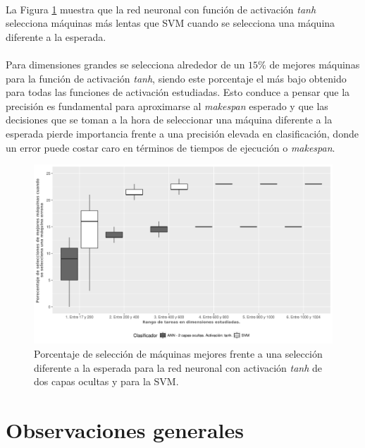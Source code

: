 \paragraph{} La Figura \ref{fig:tanh_mejores} muestra que la red neuronal con función de activación \textit{tanh} selecciona máquinas más lentas que SVM cuando se selecciona una máquina diferente a la esperada.

\paragraph{} Para dimensiones grandes se selecciona alrededor de un $15\%$ de mejores máquinas para la función de activación \textit{tanh}, siendo este porcentaje el más bajo obtenido para todas las funciones de activación estudiadas.
Esto conduce a pensar que la precisión es fundamental para aproximarse al \textit{makespan} esperado y que las decisiones que se toman a la hora de seleccionar una máquina diferente a la esperada pierde importancia frente a una precisión elevada en clasificación, donde un error puede costar caro en términos de tiempos de ejecución o \textit{makespan}.

\newpage %

\begin{figure}[H]
  \centering
  \includegraphics[width=\columnwidth]{imagenes/tanh/4_porcentaje_maquinas_mejores_ann_2_capas_ocultas_tanh.png}
  \caption{Porcentaje de selección de máquinas mejores frente a una selección diferente a la esperada para la red neuronal con activación \textit{tanh} de dos capas ocultas y para la SVM.}
  \label{fig:tanh_mejores}
\end{figure}

\newpage %

\section{Observaciones generales}

